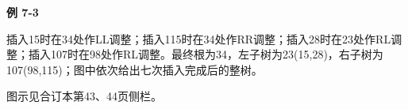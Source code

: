 {\color{ink}\bfseries 例 7-3}\par\vspace{1bp}插入15时在34处作LL调整；插入115时在34处作RR调整；插入28时在23处作RL调整；插入107时在98处作RL调整。最终根为34，左子树为23(15,\allowbreak{}28)，右子树为107(98,\allowbreak{}115)；图中依次给出七次插入完成后的整树。\par {\color{ink}图示见合订本第43、44页侧栏。}
